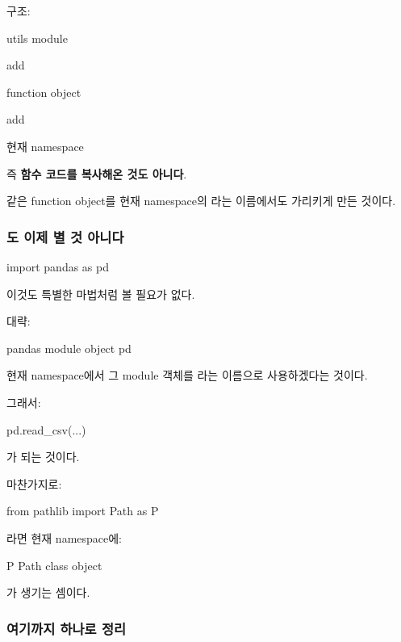 구조:

\begin{dhksmry}[centered]
utils module

\da

add

\da

function object

\ua

add

\ua

현재 namespace
\end{dhksmry}

즉 \textbf{함수 코드를 복사해온 것도 아니다}.

같은 function object를 현재 namespace의 라는 이름에서도 가리키게 만든 것이다.

\subsubsection{도 이제 별 것 아니다}

\begin{dhkcode}
import pandas as pd
\end{dhkcode}

이것도 특별한 마법처럼 볼 필요가 없다.

대략:

\begin{dhksmry}[centered]
pandas module object
\ua
pd
\end{dhksmry}

현재 namespace에서 그 module 객체를 라는 이름으로 사용하겠다는 것이다.

그래서:

\begin{dhkcode}
pd.read_csv(...)
\end{dhkcode}

가 되는 것이다.

마찬가지로:

\begin{dhkcode}
from pathlib import Path as P
\end{dhkcode}

라면 현재 namespace에:

\begin{dhksmry}[centered]
P \ra Path class object
\end{dhksmry}

가 생기는 셈이다.

\subsubsection{여기까지 하나로 정리}

